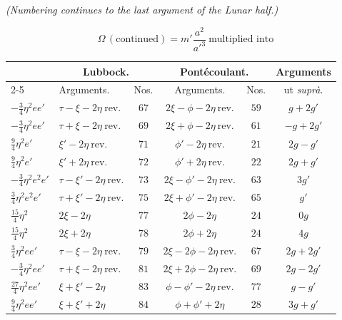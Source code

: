 \documentclass[12pt,a4paper]{article}
\theoremstyle{plain}
\begin{document}
\medskip
\noindent\hbox{}\hfill\textit{(Numbering continues to the last argument of the Lunar half.)}

\newpage
{}
\[
\Omega\,(\text{continued})=m'\frac{a^{2}}{a'^{3}}\ \text{multiplied into}
\]

\begin{center}
\small
\begin{tabular}{|l|l|c|c|c|c|}
\hline
& \multicolumn{2}{c|}{Lubbock.} & \multicolumn{2}{c|}{Pont\'ecoulant.} & Arguments \\
\cline{2-5}
& Arguments. & Nos. & Arguments. & Nos. & ut \textit{supr\`a}. \\
\hline
$-\tfrac{3}{4}\eta^{2} ee'$  & $\tau-\xi-2\eta\ \text{rev.}$ & $67$ & $2\xi-\phi-2\eta\ \text{rev.}$ & $59$ & $g+2g'$ \\
$-\tfrac{3}{4}\eta^{2} e e'$ & $\tau+\xi-2\eta\ \text{rev.}$ & $69$ & $2\xi+\phi-2\eta\ \text{rev.}$ & $61$ & $-g+2g'$ \\
$\tfrac{9}{4}\eta^{2} e'$    & $\xi'-2\eta\ \text{rev.}$     & $71$ & $\phi'-2\eta\ \text{rev.}$     & $21$ & $2g-g'$ \\
$\tfrac{9}{4}\eta^{2} e'$    & $\xi'+2\eta\ \text{rev.}$     & $72$ & $\phi'+2\eta\ \text{rev.}$     & $22$ & $2g+g'$ \\
$-\tfrac{3}{4}\eta^{2} e^{2}e'$ & $\tau-\xi'-2\eta\ \text{rev.}$ & $73$ & $2\xi-\phi'-2\eta\ \text{rev.}$ & $63$ & $3g'$ \\
$\tfrac{3}{4}\eta^{2} e^{2}e'$ & $\tau+\xi'-2\eta\ \text{rev.}$ & $75$ & $2\xi+\phi'-2\eta\ \text{rev.}$ & $65$ & $g'$ \\
$\tfrac{15}{4}\eta^{2}$      & $2\xi-2\eta$                   & $77$ & $2\phi-2\eta$                  & $24$ & $0g$ \\
$\tfrac{15}{4}\eta^{2}$      & $2\xi+2\eta$                   & $78$ & $2\phi+2\eta$                  & $24$ & $4g$ \\
$\tfrac{3}{4}\eta^{2} e e'$  & $\tau-\xi-2\eta\ \text{rev.}$  & $79$ & $2\xi-2\phi-2\eta\ \text{rev.}$ & $67$ & $2g+2g'$ \\
$-\tfrac{3}{4}\eta^{2} e e'$ & $\tau+\xi-2\eta\ \text{rev.}$  & $81$ & $2\xi+2\phi-2\eta\ \text{rev.}$ & $69$ & $2g-2g'$ \\
$\tfrac{27}{4}\eta^{2} e e'$ & $\xi+\xi'-2\eta$               & $83$ & $\phi-\phi'-2\eta\ \text{rev.}$ & $77$ & $g-g'$ \\
$\tfrac{9}{4}\eta^{2} e e'$  & $\xi+\xi'+2\eta$               & $84$ & $\phi+\phi'+2\eta$             & $28$ & $3g+g'$ \\
\hline
\end{tabular}
\end{center}
\end{document}
